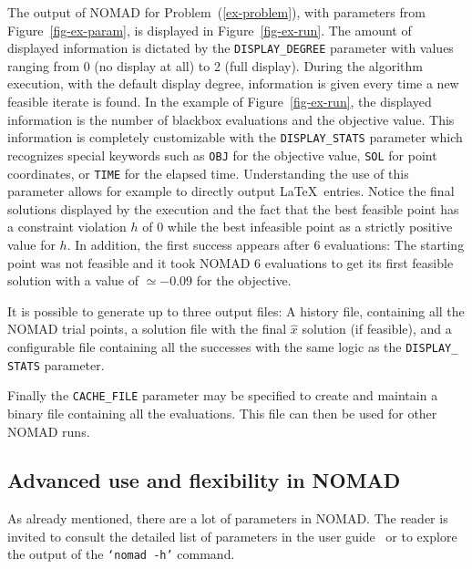 \documentclass[12pt,english]{article}
\newcommand{\nomad}{NOMAD\xspace}
\newcommand{\bb}{blackbox\xspace}
\begin{document}
The output of \nomad for Problem~(\ref{ex-problem}), with
 parameters from Figure~\ref{fig-ex-param}, is displayed in Figure~\ref{fig-ex-run}.
The amount of displayed information is dictated
          by the \texttt{DISPLAY\_DEGREE} parameter
          with values ranging from
          0 (no display at all) to 2 (full display).
During the algorithm execution, with the default display degree,
       information is given every time a new feasible iterate is found.
       In the example of Figure~\ref{fig-ex-run}, the displayed information
       is the number of \bb evaluations and the objective value.
 This information is completely customizable with the
         \texttt{DISPLAY\_STATS} parameter which recognizes special keywords
         such as \texttt{OBJ} for the objective value,
         \texttt{SOL} for point coordinates,
         or \texttt{TIME} for the elapsed time.
 Understanding the use of this parameter
         allows for example to directly output \LaTeX~entries.
  Notice the final solutions displayed by the execution and the fact that
    the best feasible point has a constraint violation
    $h$ of 0 while the best infeasible point
    as a strictly positive value for $h$.
  In addition, the first success appears after 6 evaluations: The starting point
    was not feasible and it took \nomad 6 evaluations to get
    its first feasible solution with a value of $\simeq -0.09$
    for the objective.

  It is possible to generate up to three output files: A history file,
      containing all the \nomad trial points, a solution file with the final
      $\hat{x}$ solution (if feasible), and a configurable file
      containing all the successes with the same logic as the
      \texttt{DISPLAY\_} \texttt{STATS} parameter.

  Finally the \texttt{CACHE\_FILE} parameter
    may be specified to create and maintain a binary file
    containing all the evaluations.
  This file can then be used for other \nomad runs.

  \subsection*{Advanced use and flexibility in \nomad}
  \label{sec-advanced-use}

As already mentioned, there are a lot of parameters in \nomad.
The reader is invited to consult the detailed list of parameters in the
  user guide~\cite{Le09a} or to explore the output of the \texttt{`nomad -h'}
  command.
\end{document}
